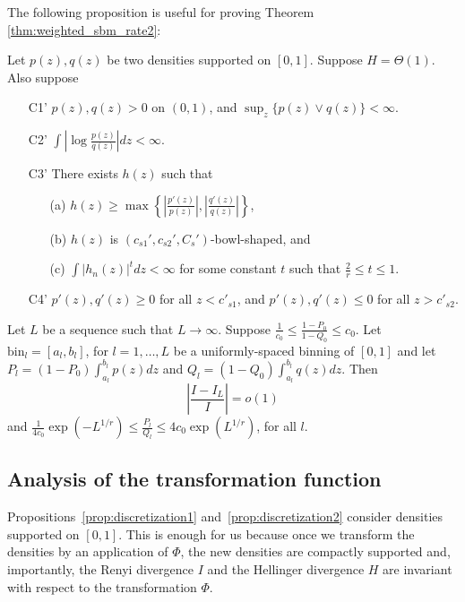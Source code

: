 \documentclass{article}
\newcommand{\bin}{\text{bin}}
\begin{document}
\medskip

\noindent The following proposition is useful for proving Theorem \ref{thm:weighted_sbm_rate2}:

\begin{proposition}
\label{prop:discretization2}
Let $p(z), q(z)$ be two densities supported on $[0,1]$. Suppose $H = \Theta(1)$. Also suppose
\begin{enumerate}
\item[C1']  $p(z), q(z) > 0$ on $(0, 1)$, and $\sup_z \{p(z) \vee q(z)\} < \infty$. 
\item[C2'] $\int \left| \log \frac{p(z)}{q(z)} \right| dz < \infty$.
\item[C3']  There exists $h(z)$ such that
\begin{itemize}
\item[(a)] $h(z) \geq \max \left\{  \left|\frac{p'(z)}{p(z)} \right|, \left|\frac{q'(z)}{q(z)}\right|  \right\}$,
\item[(b)] $h(z)$ is $(c_{s1}', c_{s2}', C_s')$-bowl-shaped, and
\item[(c)] $\int |h_{n}(z)|^t dz < \infty$ for some constant $t$ such that  $\frac{2}{r} \le t \le 1$.
\end{itemize}
\item[C4']  $p'(z), q'(z) \geq 0$ for all $z < c'_{s1}$, and $p'(z), q'(z) \leq 0$ for all $z > c'_{s2}$.
\end{enumerate}
Let $L$ be a sequence such that $L \rightarrow \infty$. Suppose $\frac{1}{c_0} \leq \frac{1 - P_0}{1-Q_0} \leq c_0$. Let $\bin_l = [a_l, b_l]$, for $l=1, \dots, L$ be a uniformly-spaced binning of $[0,1]$ and let $P_l = (1- P_0) \int_{a_l}^{b_l} p(z) dz$ and $Q_l = (1-Q_0)\int_{a_l}^{b_l} q(z) dz$.
Then
$$ \left| \frac{I - I_L}{I} \right| = o(1)$$ 
and $\frac{1}{4c_0} \exp(-L^{1/r}) \leq \frac{P_l}{Q_l} \leq 4 c_0 \exp(L^{1/r})$, for all $l$. 
\end{proposition}


\subsection{Analysis of the transformation function}
\label{sec:transformation_analysis}

Propositions~\ref{prop:discretization1} and~\ref{prop:discretization2} consider densities supported on $[0,1]$. This is enough for us because once we transform the densities by an application of $\Phi$, the new densities are compactly supported and, importantly, the Renyi divergence $I$ and the Hellinger divergence $H$ are invariant with respect to the transformation $\Phi$.
\end{document}
